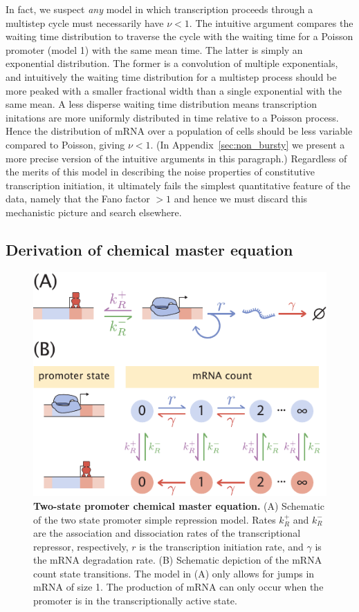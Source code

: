 In fact, we suspect \textit{any} model in which transcription proceeds through a
multistep cycle must necessarily have $\nu<1$. The intuitive argument compares
the waiting time distribution to traverse the cycle with the waiting time for a
Poisson promoter (model 1) with the same mean time. The latter is simply an
exponential distribution. The former is a convolution of multiple exponentials,
and intuitively the waiting time distribution for a multistep process
should be more peaked with a smaller fractional width than a single
exponential with the same mean.
A less disperse waiting time distribution means transcription initations are
more uniformly distributed in time relative to a Poisson process. Hence the
distribution of mRNA over a population of cells should be less variable compared
to Poisson, giving $\nu<1$.
(In Appendix~\ref{sec:non_bursty} we present a more precise version
of the intuitive arguments in this paragraph.)
Regardless of the merits of this model in describing the noise properties of
constitutive transcription initiation, it ultimately fails the simplest
quantitative feature of the data, namely that the Fano factor $> 1$ and hence
we must discard this mechanistic picture and search elsewhere.

\subsection{Derivation of chemical master equation}
\label{sec:cme_from_cartoon}

\begin{figure}[h!]
\centering
\includegraphics{../../figures/si/figS0X_two_state.pdf}
\caption{
\textbf{Two-state promoter chemical master equation.}
(A) Schematic of the two state promoter simple repression model. Rates $k_R^+$
and $k_R^-$ are the association and dissociation rates of the transcriptional
repressor, respectively, $r$ is the transcription initiation rate, and $\gamma$
is the mRNA degradation rate. (B) Schematic depiction of the mRNA count state
transitions. The model in (A) only allows for jumps in mRNA of size 1. The
production of mRNA can only occur when the promoter is in the transcriptionally
active state.}
\label{fig:two_state}
\end{figure}


